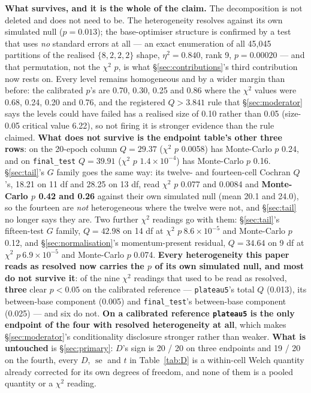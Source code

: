 \documentclass[10pt,letterpaper]{article}
\newcommand{\Dstat}{D}                         %
\newcommand{\Gstat}{G}                         %
\newcommand{\plateau}{\texttt{plateau5}}
\DeclareMathOperator{\se}{se}
\begin{document}
\textbf{What survives, and it is the whole of the claim.} The decomposition is not deleted and
does not need to be. The heterogeneity resolves against its own simulated null
($p = 0.013$); the base-optimiser structure is confirmed by a test that uses \emph{no} standard
errors at all --- an exact enumeration of all 45{,}045 partitions of the realised
$\{8, 2, 2, 2\}$ shape, $\eta^2 = 0.840$, rank 9, $p = 0.00020$ --- and that permutation, not
the $\chi^2$ $p$, is what \S\ref{sec:contributions}'s third contribution now rests on. Every
level remains homogeneous and by a wider margin than before: the calibrated $p$'s are 0.70, 0.30,
0.25 and 0.86 where the $\chi^2$ values were 0.68, 0.24, 0.20 and 0.76, and the registered
$Q > 3.841$ rule that \S\ref{sec:moderator} says the levels could have failed has a realised
size of 0.10 rather than 0.05 (size-0.05 critical value 6.22), so not firing it is stronger
evidence than the rule claimed. \textbf{What does not survive is the endpoint table's other three
rows}: on the 20-epoch column $Q = 29.37$ ($\chi^2$ $p$ 0.0058) has Monte-Carlo $p$ 0.24, and on
\texttt{final\_test} $Q = 39.91$ ($\chi^2$ $p$ $1.4\times10^{-4}$) has Monte-Carlo $p$ 0.16.
\S\ref{sec:tail}'s $\Gstat$ family goes the same way: its twelve- and fourteen-cell Cochran
$Q$'s, 18.21 on 11 df and 28.25 on 13 df, read $\chi^2$ $p$ 0.077 and 0.0084 and \textbf{Monte-Carlo
$p$ 0.42 and 0.26} against their own simulated null (mean 20.1 and 24.0), so the fourteen are
\emph{not} heterogeneous where the twelve were not, and \S\ref{sec:tail} no longer says they
are. Two further $\chi^2$ readings go with them: \S\ref{sec:tail}'s fifteen-test $\Gstat$
family, $Q = 42.98$ on 14 df at $\chi^2$ $p\ 8.6\times10^{-5}$ and Monte-Carlo $p$ 0.12, and
\S\ref{sec:normalisation}'s momentum-present residual, $Q = 34.64$ on 9 df at $\chi^2$
$p\ 6.9\times10^{-5}$ and Monte-Carlo $p$ 0.074. \textbf{Every heterogeneity this paper reads as
resolved now carries the $p$ of its own simulated null, and most do not survive it}: of the nine
$\chi^2$ readings that used to be read as resolved, \textbf{three} clear $p < 0.05$ on the
calibrated reference --- \plateau{}'s total $Q$ (0.013), its between-base component (0.005) and
\texttt{final\_test}'s between-base component (0.025) --- and six do not.
\textbf{On a calibrated reference \plateau{} is the only endpoint of the four with resolved
heterogeneity at all}, which makes \S\ref{sec:moderator}'s conditionality disclosure stronger
rather than weaker. \textbf{What is untouched} is \S\ref{sec:primary}: $\Dstat$'s sign is
20 / 20 on three endpoints and 19 / 20 on the fourth, every $\Dstat$, $\se$ and $t$ in
Table~\ref{tab:D} is a within-cell Welch quantity already corrected for its own degrees of
freedom, and none of them is a pooled quantity or a $\chi^2$ reading.
\end{document}
